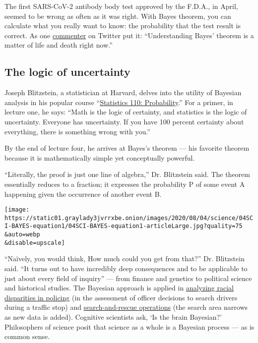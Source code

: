The first SARS-CoV-2 antibody body test approved by the F.D.A., in
April, seemed to be wrong as often as it was right. With Bayes theorem,
you can calculate what you really want to know: the probability that the
test result is correct. As one
\href{https://twitter.com/Riderius/status/1246172832071135236}{commenter}
on Twitter put it: ``Understanding Bayes' theorem is a matter of life
and death right now.''

\hypertarget{the-logic-of-uncertainty}{%
\subsection{The logic of uncertainty}\label{the-logic-of-uncertainty}}

Joseph Blitzstein, a statistician at Harvard, delves into the utility of
Bayesian analysis in his popular course
``\href{https://www.youtube.com/playlist?list=PL2SOU6wwxB0uwwH80KTQ6ht66KWxbzTIo}{Statistics
110: Probability}.'' For a primer, in lecture one, he says: ``Math is
the logic of certainty, and statistics is the logic of uncertainty.
Everyone has uncertainty. If you have 100 percent certainty about
everything, there is something wrong with you.''

By the end of lecture four, he arrives at Bayes's theorem --- his
favorite theorem because it is mathematically simple yet conceptually
powerful.

``Literally, the proof is just one line of algebra,'' Dr. Blitzstein
said. The theorem essentially reduces to a fraction; it expresses the
probability P of some event A happening given the occurrence of another
event B.

\texttt{[image: https://static01.graylady3jvrrxbe.onion/images/2020/08/04/science/04SCI-BAYES-equation1/04SCI-BAYES-equation1-articleLarge.jpg?quality=75\\\&auto=webp\\\&disable=upscale]}

``Naïvely, you would think, How much could you get from that?'' Dr.
Blitzstein said. ``It turns out to have incredibly deep consequences and
to be applicable to just about every field of inquiry'' --- from finance
and genetics to political science and historical studies. The Bayesian
approach is applied in
\href{https://www.nature.com/articles/s41562-020-0858-1}{analyzing
racial disparities in policing} (in the assessment of officer decisions
to search drivers during a traffic stop) and
\href{https://www.nytimes3xbfgragh.onion/2014/09/30/science/the-odds-continually-updated.html}{search-and-rescue
operations} (the search area narrows as new data is added). Cognitive
scientists ask, `Is the brain Bayesian?' Philosophers of science posit
that science as a whole is a Bayesian process --- as is common sense.

